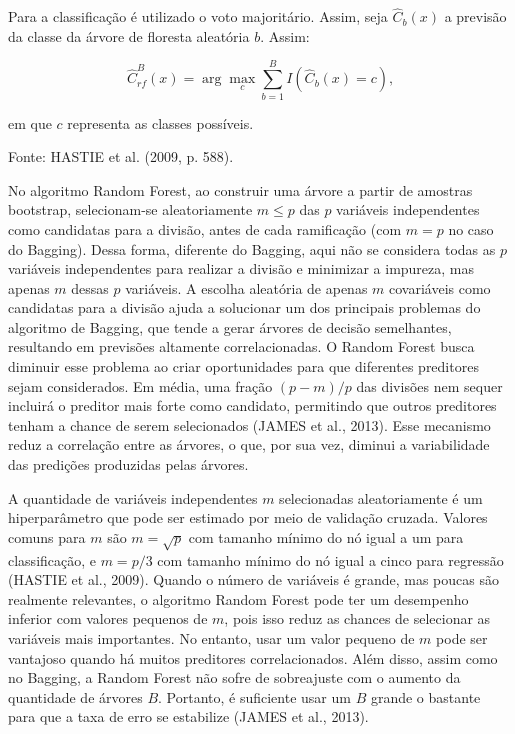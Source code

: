 \documentclass[
  12pt,
  a4paper,
]{scrreprt}
\begin{document}
\begin{algo}
{\begin{algorithm}[H]
\begin{algorithmic}
\vspace{1em}

\State \hspace{0.7em} Para a classificação é utilizado o voto majoritário. Assim, seja $\hat{C}_{b}\left(x\right)$ a previsão da classe da árvore de floresta aleatória $b$. Assim:

$$
\hat{C}^{B}_{rf}\left(x\right) = \arg \max_c \sum^{B}_{b = 1}I\left(\hat{C}_b\left(x\right) = c\right)\text{,}
$$

\State em que $c$ representa as classes possíveis.

\end{algorithmic}
\end{algorithm}

}

\caption{\label{algo-rf}Fonte: HASTIE et al. (2009, p. 588).}

\end{algo}%

No algoritmo Random Forest, ao construir uma árvore a partir de amostras
bootstrap, selecionam-se aleatoriamente \(m \leq p\) das \(p\) variáveis
independentes como candidatas para a divisão, antes de cada ramificação
(com \(m = p\) no caso do Bagging). Dessa forma, diferente do Bagging,
aqui não se considera todas as \(p\) variáveis independentes para
realizar a divisão e minimizar a impureza, mas apenas \(m\) dessas \(p\)
variáveis. A escolha aleatória de apenas \(m\) covariáveis como
candidatas para a divisão ajuda a solucionar um dos principais problemas
do algoritmo de Bagging, que tende a gerar árvores de decisão
semelhantes, resultando em previsões altamente correlacionadas. O Random
Forest busca diminuir esse problema ao criar oportunidades para que
diferentes preditores sejam considerados. Em média, uma fração
\((p -m)/ p\) das divisões nem sequer incluirá o preditor mais forte
como candidato, permitindo que outros preditores tenham a chance de
serem selecionados (JAMES et al., 2013). Esse mecanismo reduz a
correlação entre as árvores, o que, por sua vez, diminui a variabilidade
das predições produzidas pelas árvores.

\vspace{12pt}

A quantidade de variáveis independentes \(m\) selecionadas
aleatoriamente é um hiperparâmetro que pode ser estimado por meio de
validação cruzada. Valores comuns para \(m\) são
\(m=\sqrt{p}\)\hspace{0pt} com tamanho mínimo do nó igual a um para
classificação, e \(m=p/3\)\hspace{0pt} com tamanho mínimo do nó igual a
cinco para regressão (HASTIE et al., 2009). Quando o número de variáveis
é grande, mas poucas são realmente relevantes, o algoritmo Random Forest
pode ter um desempenho inferior com valores pequenos de \(m\), pois isso
reduz as chances de selecionar as variáveis mais importantes. No
entanto, usar um valor pequeno de \(m\) pode ser vantajoso quando há
muitos preditores correlacionados. Além disso, assim como no Bagging, a
Random Forest não sofre de sobreajuste com o aumento da quantidade de
árvores \(B\). Portanto, é suficiente usar um \(B\) grande o bastante
para que a taxa de erro se estabilize (JAMES et al., 2013).
\end{document}
